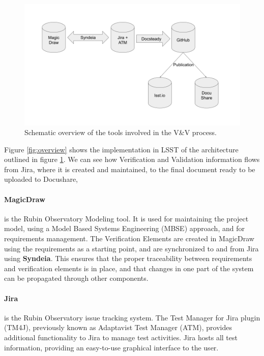 \begin{figure}
\begin{center}
\includegraphics[width=\textwidth]{imgs/VandVtools.png}
 \caption{Schematic overview of the tools involved in the V\&V process.}
 \label{fig:vandvtools}
\end{center}
\end{figure}

Figure \ref{fig:overview} shows the implementation in LSST of the architecture outlined in figure \ref{fig:vandvtools}.
We can see how Verification and Validation information flows from Jira, where it is created and maintained,
to the final document ready to be uploaded to Docushare, 


\paragraph{MagicDraw}
is the Rubin Observatory Modeling tool. It is used for maintaining the project model,
using a Model Based Systems Engineering (MBSE) approach, and for requirements management.
The Verification Elements are created in MagicDraw using the requirements as a starting point,
and are synchronized to and from Jira using \textbf{Syndeia}.
This ensures that the proper traceability between requirements and verification elements is in place,
and that changes in one part of the system can be propagated through other components.

\paragraph{Jira}
is the Rubin Observatory issue tracking system.
The Test Manager for Jira plugin (TM4J), previously known as Adaptavist Test Manager (ATM),
provides additional functionality to Jira to manage test activities.
Jira hosts all test information, providing an easy-to-use graphical interface to the user.

